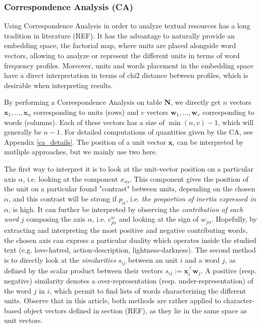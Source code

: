 \documentclass[
twocolumn,
]{ceurart}
\begin{document}
\subsubsection{Correspondence Analysis (CA)}
\label{ca_method}

Using Correspondence Analysis in order to analyze textual resources has a long tradition in literature (REF). It has the advantage to naturally provide an embedding space, the factorial map, where units are placed alongside word vectors, allowing to analyze or represent the different units in terms of word frequency profiles. Moreover, units and words placement in the embedding space have a direct interpretation in terms of chi2 distance between profiles, which is desirable when interpreting results.

By performing a Correspondence Analysis on table $\mathbf{N}$, we directly get $n$ vectors $\mathbf{x}_1, \ldots, \mathbf{x}_n$ corresponding to units (rows) and $v$ vectors $\mathbf{w}_1, \ldots, \mathbf{w}_v$ corresponding to words (columns). Each of these vectors has a size of $\min(n, v) - 1$, which will generally be $n - 1$. For detailed computations of quantities given by the CA, see Appendix \ref{ca_details}. The position of a unit vector $\mathbf{x}_i$ can be interpreted by mutliple approaches, but we mainly use two here.

The first way to interpret it is to look at the unit-vector position on a particular axis $\alpha$, i.e. looking at the component $x_{i\alpha}$. This component gives the position of the unit on a particular found "contrast" between units, depending on the chosen $\alpha$, and this contrast will be strong if $p_\alpha$, i.e. \emph{the proportion of inertia expressed in $\alpha$}, is high. It can further be interpreted by observing the \emph{contribution of each word $j$} composing the axis $\alpha$, i.e. $c^w_{j\alpha}$ and looking at the sign of $w_{j\alpha}$. Hopefully, by extracting and interpreting the most positive and negative contributing words, the chosen axis can express a particular duality which operates inside the studied text (e.g. love-hatred, action-description, lightness-darkness). The second method is to directly look at the \emph{similarities} $s_{ij}$ between an unit $i$ and a word $j$, as defined by the scalar product between their vectors $s_{ij} := \mathbf{x}^\top_i \mathbf{w}_j$. A positive (resp. negative) similarity denotes a over-representation (resp. under-representation) of the word $j$ in $i$, which permit to find lists of words characterizing the different units. Observe that in this article, both methods are rather applied to character-based object vectors defined in section (REF), as they lie in the same space as unit vectors. 
\end{document}
